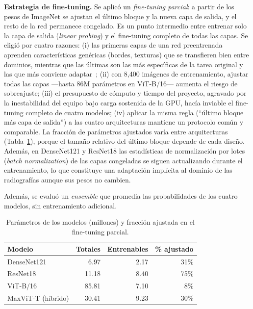 \documentclass[conference]{IEEEtran}
\begin{document}
\textbf{Estrategia de fine-tuning.} Se aplicó un \emph{fine-tuning parcial}: a partir de los pesos de ImageNet se ajustan el último bloque y la nueva capa de salida, y el resto de la red permanece congelado. Es un punto intermedio entre entrenar solo la capa de salida (\emph{linear probing}) y el fine-tuning completo de todas las capas. Se eligió por cuatro razones:
(i) las primeras capas de una red preentrenada aprenden características genéricas (bordes, texturas) que se transfieren bien entre dominios, mientras que las últimas son las más específicas de la tarea original y las que más conviene adaptar~\cite{yosinski2014transferable};
(ii) con 8{,}400 imágenes de entrenamiento, ajustar todas las capas ---hasta 86M parámetros en ViT-B/16--- aumenta el riesgo de sobreajuste;
(iii) el presupuesto de cómputo y tiempo del proyecto, agravado por la inestabilidad del equipo bajo carga sostenida de la GPU, hacía inviable el fine-tuning completo de cuatro modelos;
(iv) aplicar la misma regla (``último bloque más capa de salida'') a las cuatro arquitecturas mantiene un protocolo común y comparable.
La fracción de parámetros ajustados varía entre arquitecturas (Tabla~\ref{tab:params}), porque el tamaño relativo del último bloque depende de cada diseño. Además, en DenseNet121 y ResNet18 las estadísticas de normalización por lotes (\emph{batch normalization}) de las capas congeladas se siguen actualizando durante el entrenamiento, lo que constituye una adaptación implícita al dominio de las radiografías aunque sus pesos no cambien.

Además, se evaluó un \emph{ensemble} que promedia las probabilidades de los cuatro modelos, sin entrenamiento adicional.

\begin{table}[t]
\centering
\caption{Parámetros de los modelos (millones) y fracción ajustada en el fine-tuning parcial.}
\label{tab:params}
\begin{tabular}{lrrr}
\toprule
Modelo & Totales & Entrenables & \% ajustado \\
\midrule
DenseNet121 & 6.97 & 2.17 & 31\% \\
ResNet18 & 11.18 & 8.40 & 75\% \\
ViT-B/16 & 85.81 & 7.10 & 8\% \\
MaxViT-T (híbrido) & 30.41 & 9.23 & 30\% \\
\bottomrule
\end{tabular}
\end{table}
\end{document}
